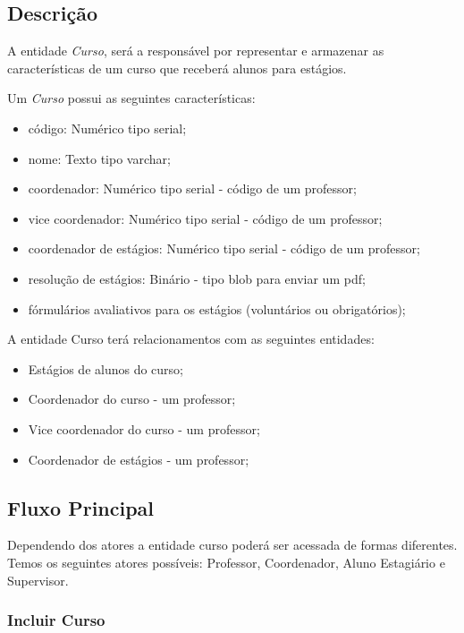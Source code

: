 \subsection{Descrição}
A entidade \emph{Curso}, será a responsável por representar e armazenar as
características de um curso que receberá alunos para estágios.

Um \emph{Curso} possui as seguintes características:

\begin{itemize}
  \item código: Numérico tipo serial;
  \item nome: Texto tipo varchar;
  \item coordenador: Numérico tipo serial - código de um professor;
  \item vice coordenador: Numérico tipo serial - código de um professor;
  \item coordenador de estágios: Numérico tipo serial - código de um professor;
  \item resolução de estágios: Binário - tipo  blob para enviar um pdf;
  \item fórmulários avaliativos para os estágios (voluntários ou obrigatórios);
\end{itemize}

A entidade Curso terá relacionamentos com as seguintes entidades:

\begin{itemize}
  \item Estágios de alunos do curso;
  \item Coordenador do curso - um professor;
  \item Vice coordenador do curso - um professor;
  \item Coordenador de estágios - um professor; 
\end{itemize}
 
\subsection{Fluxo Principal}

Dependendo dos atores a entidade curso poderá ser acessada de formas diferentes.
Temos os seguintes atores possíveis: Professor, Coordenador, Aluno Estagiário e
Supervisor.

\subsubsection{Incluir Curso}

